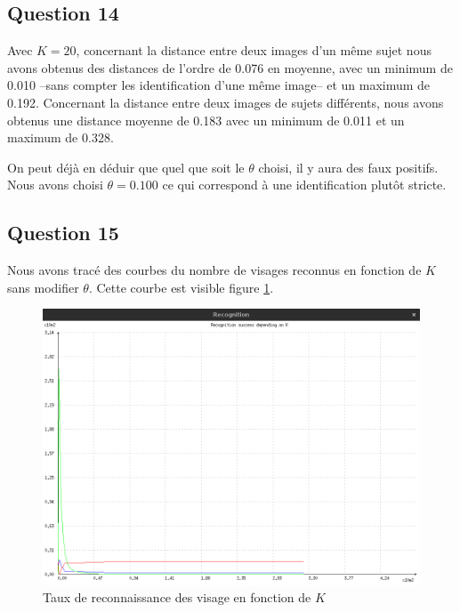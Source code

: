 \documentclass[a4paper]{article}
\begin{document}
\subsection{Question 14}

Avec $K=20$, concernant la distance entre deux images d'un même sujet nous avons obtenus des distances de
l'ordre de 0.076 en moyenne, 
avec un minimum de 0.010 
--sans compter les identification d'une même image--
et un maximum de 0.192.
Concernant la distance entre deux images de sujets différents, nous avons obtenus une 
distance moyenne de 0.183 
avec un minimum de 0.011
et un maximum de 0.328.

On peut déjà en déduir que quel que soit le $\theta$ choisi, il y aura des faux positifs.
Nous avons choisi $\theta = 0.100$ ce qui correspond à une identification plutôt stricte.

\subsection{Question 15}

Nous avons tracé des courbes du nombre de visages reconnus en fonction de $K$ sans modifier $\theta$.
Cette courbe est visible figure \ref{q15}.

\begin{figure}[!ht]
    \centering
    \includegraphics[width=\textwidth]{img/q15_recognition.png}
    \caption{Taux de reconnaissance des visage en fonction de $K$}
    \label{q15}
\end{figure}
\end{document}
